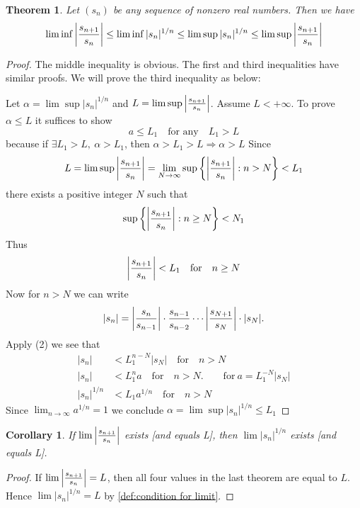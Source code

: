 \documentclass[12pt, lettersize]{book}
\newtheorem{thm}{Theorem}[section]
\newtheorem{cor}{Corollary}[thm]
\begin{document}
	\setcounter{equation}{0}
	\begin{thm}\label{thm:12.2}
		Let $(s_n)$ be any sequence of nonzero real numbers. Then we have
		\begin{displaymath}
			\lim\inf\abs{\frac{s_{n+1}}{s_n}}\leq\lim\inf|s_n|^{1/n}\leq\lim\sup|s_n|^{1/n}\leq\lim\sup\abs{\frac{s_{n+1}}{s_n}}
		\end{displaymath}
	\end{thm}
	\begin{proof}
		The middle inequality is obvious. The first and third inequalities have similar proofs. We will prove the third
		inequality as below:
		
		Let $\alpha=\lim\sup|s_n|^{1/n}$ and $L=\lim\sup\abs{\frac{s_{n+1}}{s_n}}$. Assume $L<+\infty$. To prove $\alpha\leq L$ it suffices to show
		\begin{equation}
			a\leq L_1\quad\text{for any}\quad L_1>L
		\end{equation}
		because if $\exists L_1>L,\ \alpha>L_1$, then $\alpha>L_1>L\Rightarrow\alpha>L$
		Since
		\begin{displaymath}
			L=\lim\sup\abs{\frac{s_{n+1}}{s_n}}=\lim\limits_{N\rightarrow\infty}\sup \left\{ \abs{\frac{s_{n+1}}{s_n}}: n>N \right\} <L_1
		\end{displaymath}
		there exists a positive integer $N$ such that
		\begin{displaymath}
			\sup\left\{\abs{\frac{s_{n+1}}{s_n}}: n\geq N\right\}<N_1
		\end{displaymath}
		Thus
		\begin{equation}
			\abs{\frac{s_{n+1}}{s_n}}<L_1\quad\text{for}\quad n\geq N
		\end{equation}
		Now for $n>N$ we can write
		\begin{displaymath}
			|s_n|=\abs{\frac{s_n}{s_{n-1}}}\cdot\frac{s_{n-1}}{s_{n-2}}\cdots\abs{\frac{s_{N+1}}{s_N}}\cdot|s_N|.
		\end{displaymath}
		Apply (2) we see that
		\begin{align*}
			|s_n|&<L_1^{n-N}|s_N|\quad\text{for}\quad n>N\\
			|s_n|&<L_1^na\quad\text{for}\quad n>N.\qquad \text{for}\ a=L_1^{-N}|s_N|\\
			|s_n|^{1/n}&<L_1a^{1/n}\quad\text{for}\quad n>N
		\end{align*}
		Since $\lim_{n\rightarrow\infty}a^{1/n}=1$ we conclude $\alpha=\lim\sup|s_n|^{1/n}\leq L_1$
	\end{proof}
	
	\begin{cor}\label{def:12.3}
		If $\lim\abs{\frac{s_{n+1}}{s_n}}$ exists [and equals L], then $\lim|s_n|^{1/n}$ exists [and equals L].
	\end{cor}
	\begin{proof}
		If $\lim\abs{\frac{s_{n+1}}{s_n}}=L$, then all four values in the last theorem are equal to $L$. Hence
		$\lim|s_n|^{1/n}=L$ by \ref{def:condition for limit}.
	\end{proof}
	\newpage
\end{document}
